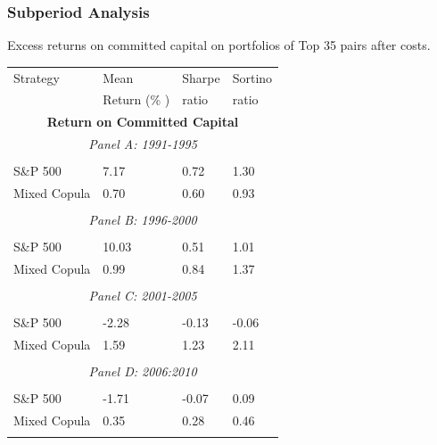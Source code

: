 \documentclass[pdf,10pt,xcolor=dvipsnames,hide notes]{beamer}
\begin{document}
\begin{frame}

\frametitle{Subperiod Analysis}
\begin{threeparttable}[H]
	\centering \tiny
	\caption{Excess returns on committed capital on portfolios of Top 35 pairs after costs. }
	\begin{tabularx}{\textwidth}{@{\extracolsep{\fill}}llll@{}}
		\toprule
		Strategy & Mean  & Sharpe & Sortino \\
		& Return (\% ) & ratio &  ratio     \\
		\midrule
		\multicolumn{4}{c}{\textbf{Return on Committed Capital}} \\
		\multicolumn{4}{c}{\textit{Panel A: 1991-1995}} \\
		&       &       &       \\
		S\&P 500 & 7.17  & 0.72  & 1.30 \\
		Mixed Copula & 0.70  & 0.60  & 0.93 \\
		\multicolumn{1}{r}{} & \multicolumn{1}{r}{} & \multicolumn{1}{r}{} & \multicolumn{1}{r}{} \\
		\multicolumn{4}{c}{\textit{Panel B: 1996-2000}} \\
		&       &       &       \\
		S\&P 500 & 10.03  & 0.51  & 1.01 \\
		Mixed Copula & 0.99  & 0.84  & 1.37 \\
		\multicolumn{1}{r}{} & \multicolumn{1}{r}{} & \multicolumn{1}{r}{} & \multicolumn{1}{r}{} \\
		\multicolumn{4}{c}{\textit{Panel C: 2001-2005}} \\
		&       &       &       \\
		S\&P 500 & -2.28  & \cellcolor{Melon} -0.13  & -0.06 \\
		Mixed Copula & 1.59  & \cellcolor{corn} 1.23  & 2.11 \\
		\multicolumn{1}{r}{} & \multicolumn{1}{r}{} & \multicolumn{1}{r}{} & \multicolumn{1}{r}{} \\
		\multicolumn{4}{c}{\textit{Panel D: 2006:2010}} \\
		&       &       &       \\
		S\&P 500 & -1.71  & \cellcolor{Melon} -0.07  & 0.09 \\
		Mixed Copula & 0.35  & \cellcolor{corn} 0.28  & 0.46 \\
		\multicolumn{1}{r}{} & \multicolumn{1}{r}{} & \multicolumn{1}{r}{} & \multicolumn{1}{r}{} \\

\end{tabularx}
\end{threeparttable}
\end{frame}
\end{document}
